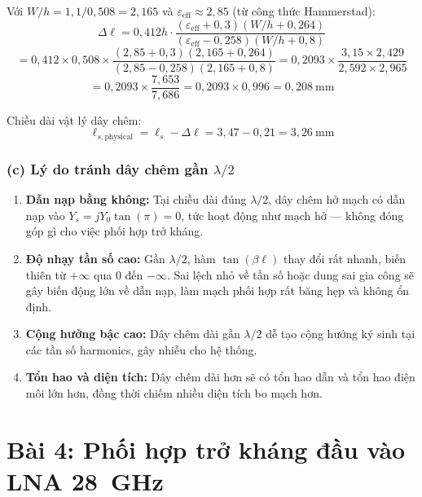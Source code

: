 \documentclass[12pt,a4paper]{article}
\begin{document}
Với $W/h = 1{,}1/0{,}508 = 2{,}165$ và $\varepsilon_{\text{eff}} \approx 2{,}85$ (từ công thức Hammerstad):
\[
\Delta\ell = 0{,}412h \cdot \frac{(\varepsilon_{\text{eff}} + 0{,}3)(W/h + 0{,}264)}{(\varepsilon_{\text{eff}} - 0{,}258)(W/h + 0{,}8)}
\]
\[
= 0{,}412 \times 0{,}508 \times \frac{(2{,}85 + 0{,}3)(2{,}165 + 0{,}264)}{(2{,}85 - 0{,}258)(2{,}165 + 0{,}8)}
= 0{,}2093 \times \frac{3{,}15 \times 2{,}429}{2{,}592 \times 2{,}965}
\]
\[
= 0{,}2093 \times \frac{7{,}653}{7{,}686} = 0{,}2093 \times 0{,}996 = 0{,}208~\text{mm}
\]

Chiều dài vật lý dây chêm:
\[
\boxed{\ell_{s,\text{physical}} = \ell_s - \Delta\ell = 3{,}47 - 0{,}21 = 3{,}26~\text{mm}}
\]

\subsubsection{(c) Lý do tránh dây chêm gần $\lambda/2$}

\begin{enumerate}
    \item \textbf{Dẫn nạp bằng không:} Tại chiều dài đúng $\lambda/2$, dây chêm hở mạch có dẫn nạp vào $Y_s = jY_0\tan(\pi) = 0$, tức hoạt động như mạch hở --- không đóng góp gì cho việc phối hợp trở kháng.
    
    \item \textbf{Độ nhạy tần số cao:} Gần $\lambda/2$, hàm $\tan(\beta\ell)$ thay đổi rất nhanh, biến thiên từ $+\infty$ qua $0$ đến $-\infty$. Sai lệch nhỏ về tần số hoặc dung sai gia công sẽ gây biến động lớn về dẫn nạp, làm mạch phối hợp rất băng hẹp và không ổn định.
    
    \item \textbf{Cộng hưởng bậc cao:} Dây chêm dài gần $\lambda/2$ dễ tạo cộng hưởng ký sinh tại các tần số harmonics, gây nhiễu cho hệ thống.
    
    \item \textbf{Tổn hao và diện tích:} Dây chêm dài hơn sẽ có tổn hao dẫn và tổn hao điện môi lớn hơn, đồng thời chiếm nhiều diện tích bo mạch hơn.
\end{enumerate}

\newpage
\section{Bài 4: Phối hợp trở kháng đầu vào LNA 28~GHz}
\end{document}
